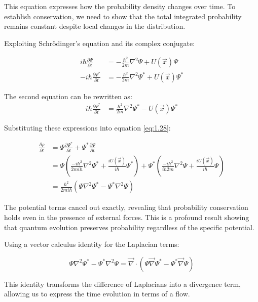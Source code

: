 This equation expresses how the probability density changes over time. To establish conservation, we need to show that the total integrated probability remains constant despite local changes in the distribution.


Exploiting Schrödinger's equation and its complex conjugate:

\begin{align}
i \hbar \frac{\partial \Psi}{\partial t} &= -\frac{\hbar^{2}}{2 m} \nabla^{2} \Psi+U(\vec{x}) \Psi \\
-i \hbar \frac{\partial \Psi^{*}}{\partial t} &= -\frac{\hbar^{2}}{2 m} \nabla^{2} \Psi^{*}+U(\vec{x}) \Psi^{*}
\end{align}

The second equation can be rewritten as:
\begin{align}
i \hbar \frac{\partial \Psi^{*}}{\partial t} &= \frac{\hbar^{2}}{2 m} \nabla^{2} \Psi^{*}-U(\vec{x}) \Psi^{*}
\end{align}

Substituting these expressions into equation \eqref{eq:1.28}:

\begin{align}
\frac{\partial \rho}{\partial t} &= \Psi \frac{\partial \Psi^{*}}{\partial t}+\Psi^{*} \frac{\partial \Psi}{\partial t} \\
&= \Psi\left(\frac{-i\hbar^{2}}{2m i\hbar} \nabla^{2} \Psi^{*}+\frac{iU(\vec{x})}{i\hbar} \Psi^{*}\right)+\Psi^{*}\left(\frac{-i\hbar^{2}}{i\hbar 2 m} \nabla^{2} \Psi+\frac{iU(\vec{x})}{i\hbar} \Psi\right) \\
&= \frac{\hbar^{2}}{2m i\hbar}\left(\Psi \nabla^{2} \Psi^{*}-\Psi^{*} \nabla^{2} \Psi\right)
\end{align}

The potential terms cancel out exactly, revealing that probability conservation holds even in the presence of external forces. This is a profound result showing that quantum evolution preserves probability regardless of the specific potential.

Using a vector calculus identity for the Laplacian terms:

\begin{equation}
\Psi \nabla^{2} \Psi^{*}-\Psi^{*} \nabla^{2} \Psi=\vec{\nabla} \cdot\left(\Psi \vec{\nabla} \Psi^{*}-\Psi^{*} \vec{\nabla} \Psi\right)
\end{equation}

This identity transforms the difference of Laplacians into a divergence term, allowing us to express the time evolution in terms of a flow.

